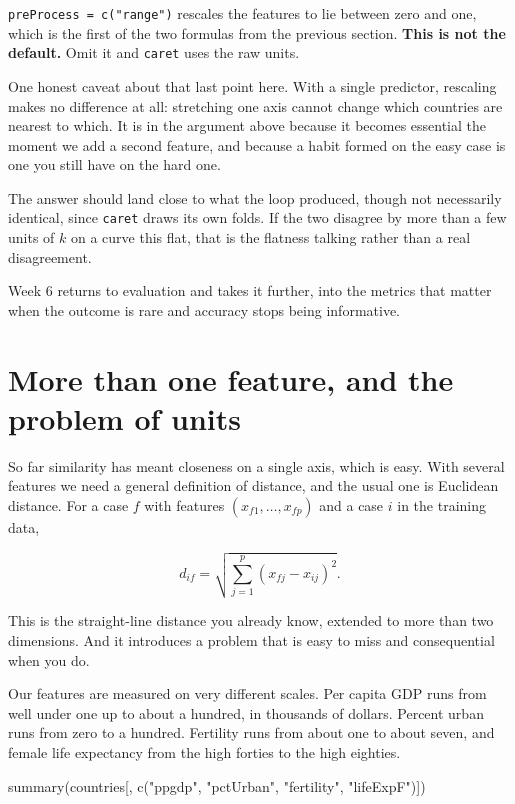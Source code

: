 \documentclass[
  a4paper,
]{scrbook}
\newenvironment{Shaded}{\begin{snugshade}}{\end{snugshade}}
\newcommand{\FunctionTok}[1]{\textcolor[rgb]{0.28,0.35,0.67}{#1}}
\newcommand{\NormalTok}[1]{\textcolor[rgb]{0.00,0.23,0.31}{#1}}
\newcommand{\StringTok}[1]{\textcolor[rgb]{0.13,0.47,0.30}{#1}}
\begin{document}
\texttt{preProcess\ =\ c("range")} rescales the features to lie between
zero and one, which is the first of the two formulas from the previous
section. \textbf{This is not the default.} Omit it and \texttt{caret}
uses the raw units.

One honest caveat about that last point here. With a single predictor,
rescaling makes no difference at all: stretching one axis cannot change
which countries are nearest to which. It is in the argument above
because it becomes essential the moment we add a second feature, and
because a habit formed on the easy case is one you still have on the
hard one.

The answer should land close to what the loop produced, though not
necessarily identical, since \texttt{caret} draws its own folds. If the
two disagree by more than a few units of \(k\) on a curve this flat,
that is the flatness talking rather than a real disagreement.

Week 6 returns to evaluation and takes it further, into the metrics that
matter when the outcome is rare and accuracy stops being informative.

\chapter{More than one feature, and the problem of
units}\label{more-than-one-feature-and-the-problem-of-units}

So far similarity has meant closeness on a single axis, which is easy.
With several features we need a general definition of distance, and the
usual one is Euclidean distance. For a case \(f\) with features
\((x_{f1}, \dots, x_{fp})\) and a case \(i\) in the training data,

\[d_{if} = \sqrt{\sum_{j=1}^{p}\left(x_{fj} - x_{ij}\right)^2}.\]

This is the straight-line distance you already know, extended to more
than two dimensions. And it introduces a problem that is easy to miss
and consequential when you do.

Our features are measured on very different scales. Per capita GDP runs
from well under one up to about a hundred, in thousands of dollars.
Percent urban runs from zero to a hundred. Fertility runs from about one
to about seven, and female life expectancy from the high forties to the
high eighties.

\begin{Shaded}
\begin{Highlighting}[]
\FunctionTok{summary}\NormalTok{(countries[, }\FunctionTok{c}\NormalTok{(}\StringTok{"ppgdp"}\NormalTok{, }\StringTok{"pctUrban"}\NormalTok{, }\StringTok{"fertility"}\NormalTok{, }\StringTok{"lifeExpF"}\NormalTok{)])}
\end{Highlighting}
\end{Shaded}
\end{document}

